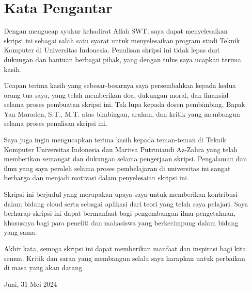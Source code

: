 \chapter*{Kata Pengantar}
Dengan mengucap syukur kehadirat Allah SWT, saya dapat menyelesaikan skripsi ini sebagai salah satu syarat untuk menyelesaikan program studi Teknik Komputer di Universitas Indonesia. Penulisan skripsi ini tidak lepas dari dukungan dan bantuan berbagai pihak, yang dengan tulus saya ucapkan terima kasih.

Ucapan terima kasih yang sebesar-besarnya saya persembahkan kepada kedua orang tua saya, yang telah memberikan doa, dukungan moral, dan finansial selama proses pembuatan skripsi ini. Tak lupa kepada dosen pembimbing, Bapak Yan Maraden, S.T., M.T. atas bimbingan, arahan, dan kritik yang membangun selama proses penulisan skripsi ini.

Saya juga ingin mengucapkan terima kasih kepada teman-teman di Teknik Komputer Universitas Indonesia dan Maritsa Putriniandi Az-Zahra yang telah memberikan semangat dan dukungan selama pengerjaan skripsi. Pengalaman dan ilmu yang saya peroleh selama proses pembelajaran di universitas ini sangat berharga dan menjadi motivasi dalam penyelesaian skripsi ini.

Skripsi ini berjudul \judul yang merupakan upaya saya untuk memberikan kontribusi dalam bidang cloud serta sebagai aplikasi dari teori yang telah saya pelajari. Saya berharap skripsi ini dapat bermanfaat bagi pengembangan ilmu pengetahuan, khususnya bagi para peneliti dan mahasiswa yang berkecimpung dalam bidang yang sama.

Akhir kata, semoga skripsi ini dapat memberikan manfaat dan inspirasi bagi kita semua. Kritik dan saran yang membangun selalu saya harapkan untuk perbaikan di masa yang akan datang.


\vspace*{0.1cm}
\begin{flushright}
	Juni, 31 Mei 2024\\[0.1cm]
	\vspace*{1cm}
	\penulis

\end{flushright}